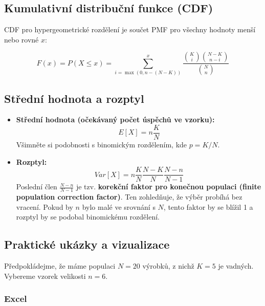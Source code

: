 \documentclass[
  czech,
  11pt,
  letterpaper,
  DIV=11,
  numbers=noendperiod]{scrreprt}
\providecommand{\tightlist}{%
  \setlength{\itemsep}{0pt}\setlength{\parskip}{0pt}}
\begin{document}
\subsection{Kumulativní distribuční funkce
(CDF)}\label{kumulativnuxed-distribuux10dnuxed-funkce-cdf-4}

CDF pro hypergeometrické rozdělení je součet PMF pro všechny hodnoty
menší nebo rovné \(x\):

\[ F(x) = P(X \le x) = \sum_{i=\max(0, n-(N-K))}^{x} \frac{\binom{K}{i} \binom{N-K}{n-i}}{\binom{N}{n}} \]

\subsection{Střední hodnota a
rozptyl}\label{stux159ednuxed-hodnota-a-rozptyl-3}

\begin{itemize}
\tightlist
\item
  \textbf{Střední hodnota (očekávaný počet úspěchů ve vzorku):}
  \[ E[X] = n \frac{K}{N} \] Všimněte si podobnosti s binomickým
  rozdělením, kde \(p = K/N\).
\item
  \textbf{Rozptyl:}
  \[ Var[X] = n \frac{K}{N} \frac{N-K}{N} \frac{N-n}{N-1} \] Poslední
  člen \(\frac{N-n}{N-1}\) je tzv. \textbf{korekční faktor pro konečnou
  populaci (finite population correction factor)}. Ten zohledňuje, že
  výběr probíhá bez vracení. Pokud by \(n\) bylo malé ve srovnání s
  \(N\), tento faktor by se blížil 1 a rozptyl by se podobal binomickému
  rozdělení.
\end{itemize}

\subsection{Praktické ukázky a
vizualizace}\label{praktickuxe9-ukuxe1zky-a-vizualizace-3}

Předpokládejme, že máme populaci \(N=20\) výrobků, z nichž \(K=5\) je
vadných. Vybereme vzorek velikosti \(n=6\).

\subsubsection*{Excel}\label{excel-3}
\end{document}
